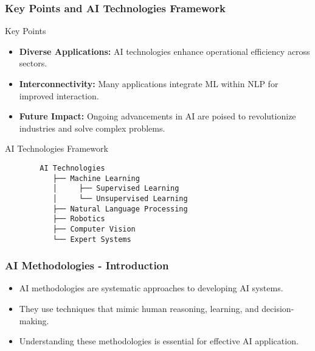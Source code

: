 \documentclass{beamer}
\begin{document}
\begin{frame}[fragile]
    \frametitle{Key Points and AI Technologies Framework}
    \begin{block}{Key Points}
        \begin{itemize}
            \item \textbf{Diverse Applications:} AI technologies enhance operational efficiency across sectors.
            \item \textbf{Interconnectivity:} Many applications integrate ML within NLP for improved interaction.
            \item \textbf{Future Impact:} Ongoing advancements in AI are poised to revolutionize industries and solve complex problems.
        \end{itemize}
    \end{block}

    \begin{block}{AI Technologies Framework}
        \begin{verbatim}
        AI Technologies
           ├── Machine Learning
           │     ├── Supervised Learning
           │     └── Unsupervised Learning
           ├── Natural Language Processing
           ├── Robotics
           ├── Computer Vision
           └── Expert Systems
        \end{verbatim}
    \end{block}
\end{frame}

\begin{frame}[fragile]
    \frametitle{AI Methodologies - Introduction}
    \begin{itemize}
        \item AI methodologies are systematic approaches to developing AI systems.
        \item They use techniques that mimic human reasoning, learning, and decision-making.
        \item Understanding these methodologies is essential for effective AI application.
    \end{itemize}
\end{frame}
\end{document}

